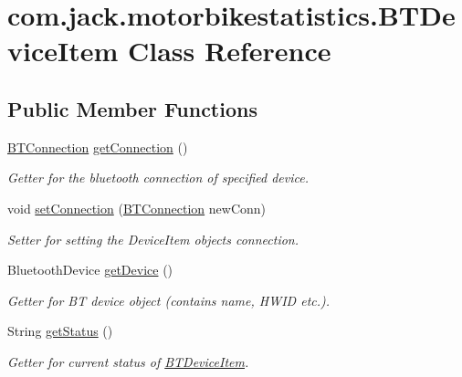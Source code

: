 \hypertarget{classcom_1_1jack_1_1motorbikestatistics_1_1_b_t_device_item}{}\section{com.\+jack.\+motorbikestatistics.\+B\+T\+Device\+Item Class Reference}
\label{classcom_1_1jack_1_1motorbikestatistics_1_1_b_t_device_item}
\subsection*{Public Member Functions}
\begin{DoxyCompactItemize}
\item 
\hyperlink{classcom_1_1jack_1_1motorbikestatistics_1_1_b_t_connection}{B\+T\+Connection} \hyperlink{classcom_1_1jack_1_1motorbikestatistics_1_1_b_t_device_item_ac3fbff10e5a5b3142ef648bf186b9be0}{get\+Connection} ()
\begin{DoxyCompactList}\small\item\em Getter for the bluetooth connection of specified device. \end{DoxyCompactList}\item 
void \hyperlink{classcom_1_1jack_1_1motorbikestatistics_1_1_b_t_device_item_a96f7261d9eab97d74569fbc3b0da4f28}{set\+Connection} (\hyperlink{classcom_1_1jack_1_1motorbikestatistics_1_1_b_t_connection}{B\+T\+Connection} new\+Conn)
\begin{DoxyCompactList}\small\item\em Setter for setting the Device\+Item object\textquotesingle{}s connection. \end{DoxyCompactList}\item 
Bluetooth\+Device \hyperlink{classcom_1_1jack_1_1motorbikestatistics_1_1_b_t_device_item_aab406fd517db729f7803d48546fd1a95}{get\+Device} ()
\begin{DoxyCompactList}\small\item\em Getter for BT device object (contains name, H\+W\+ID etc.). \end{DoxyCompactList}\item 
String \hyperlink{classcom_1_1jack_1_1motorbikestatistics_1_1_b_t_device_item_aee33189f94c2a428ac67301b536dd004}{get\+Status} ()
\begin{DoxyCompactList}\small\item\em Getter for current status of \hyperlink{classcom_1_1jack_1_1motorbikestatistics_1_1_b_t_device_item}{B\+T\+Device\+Item}. \end{DoxyCompactList}\item 

\end{DoxyCompactItemize}
